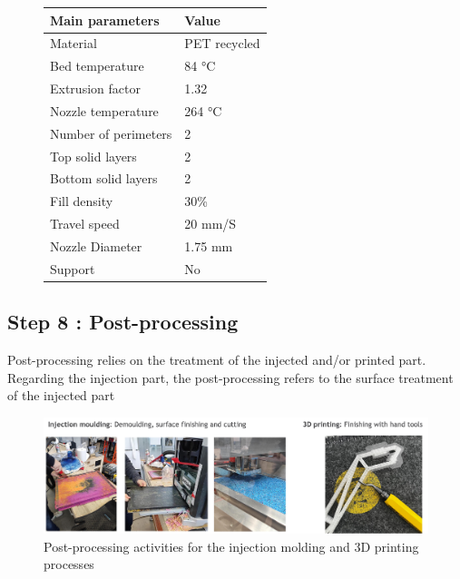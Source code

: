 \documentclass[
  11pt,
]{article}
\begin{document}
\begin{figure}
\begin{minipage}[t]{0.55\linewidth}
{\centering 

\begin{longtable}[]{@{}ll@{}}
\toprule()
Main parameters & Value \\
\midrule()
\endhead
Material & PET recycled \\
Bed temperature & 84 °C \\
Extrusion factor & 1.32 \\
Nozzle temperature & 264 °C \\
Number of perimeters & 2 \\
Top solid layers & 2 \\
Bottom solid layers & 2 \\
Fill density & 30\% \\
Travel speed & 20 mm/S \\
Nozzle Diameter & 1.75 mm \\
Support & No \\
\bottomrule()
\end{longtable}

}

\end{minipage}%

\end{figure}

\hypertarget{step-8-post-processing}{%
\subsection{Step 8 : Post-processing}\label{step-8-post-processing}}

Post-processing relies on the treatment of the injected and/or printed
part. Regarding the injection part, the post-processing refers to the
surface treatment of the injected part

\begin{figure}[H]

{\centering \includegraphics{figures/post-processing.jpg}

}

\caption{Post-processing activities for the injection molding and 3D
printing processes}

\end{figure}
\end{document}
